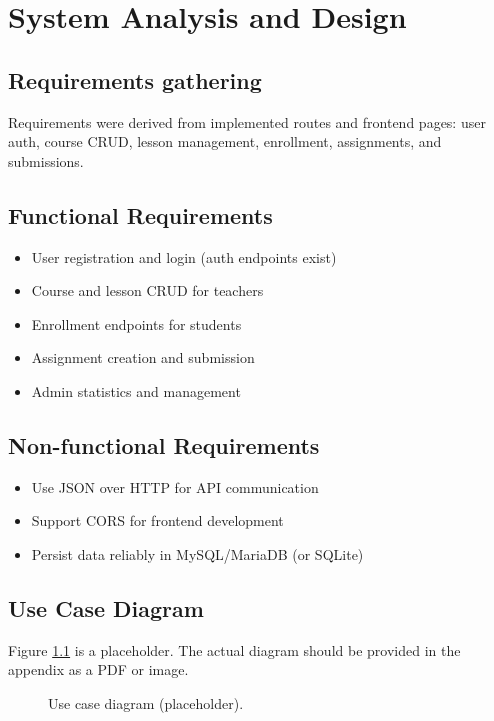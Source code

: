\documentclass[12pt,a4paper]{report}
\begin{document}
\clearpage

\chapter{System Analysis and Design}
\section{Requirements gathering}
Requirements were derived from implemented routes and frontend pages: user auth, course CRUD, lesson management, enrollment, assignments, and submissions.

\section{Functional Requirements}
\begin{itemize}
  \item User registration and login (auth endpoints exist)
  \item Course and lesson CRUD for teachers
  \item Enrollment endpoints for students
  \item Assignment creation and submission
  \item Admin statistics and management
\end{itemize}

\section{Non-functional Requirements}
\begin{itemize}
  \item Use JSON over HTTP for API communication
  \item Support CORS for frontend development
  \item Persist data reliably in MySQL/MariaDB (or SQLite)
\end{itemize}

\section{Use Case Diagram}
Figure \ref{fig:usecase} is a placeholder. The actual diagram should be provided in the appendix as a PDF or image.
\begin{figure}[H]
  \centering
  \caption{Use case diagram (placeholder).}
  \label{fig:usecase}
\end{figure}
\end{document}
